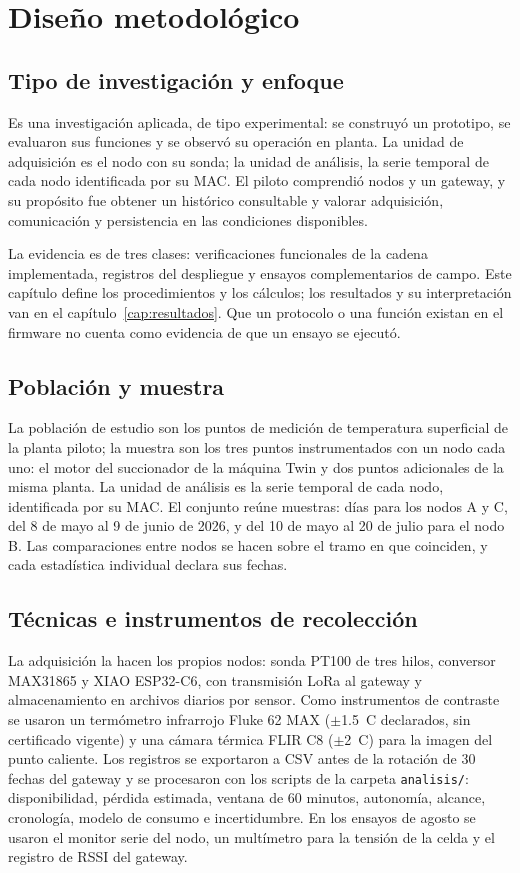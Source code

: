 \chapter{Diseño metodológico}
\label{cap:metodologia}

\section{Tipo de investigación y enfoque}
Es una investigación aplicada, de tipo experimental: se construyó un prototipo, se evaluaron sus funciones y se observó su operación en planta. La unidad de adquisición es el nodo con su sonda; la unidad de análisis, la serie temporal de cada nodo identificada por su MAC. El piloto comprendió \NumeroNodos{} nodos y un gateway, y su propósito fue obtener un histórico consultable y valorar adquisición, comunicación y persistencia en las condiciones disponibles.

La evidencia es de tres clases: verificaciones funcionales de la cadena implementada, registros del despliegue y ensayos complementarios de campo. Este capítulo define los procedimientos y los cálculos; los resultados y su interpretación van en el capítulo~\ref{cap:resultados}. Que un protocolo o una función existan en el firmware no cuenta como evidencia de que un ensayo se ejecutó.

\section{Población y muestra}
La población de estudio son los puntos de medición de temperatura superficial de la planta piloto; la muestra son los tres puntos instrumentados con un nodo cada uno: el motor del succionador de la máquina Twin y dos puntos adicionales de la misma planta. La unidad de análisis es la serie temporal de cada nodo, identificada por su MAC. El conjunto reúne \TotalMuestras{} muestras: \DuracionComunDias{} días para los nodos A y C, del 8 de mayo al 9 de junio de 2026, y del 10 de mayo al 20 de julio para el nodo B. Las comparaciones entre nodos se hacen sobre el tramo en que coinciden, y cada estadística individual declara sus fechas.

\section{Técnicas e instrumentos de recolección}
La adquisición la hacen los propios nodos: sonda PT100 de tres hilos, conversor MAX31865 y XIAO ESP32-C6, con transmisión LoRa al gateway y almacenamiento en archivos diarios por sensor. Como instrumentos de contraste se usaron un termómetro infrarrojo Fluke 62 MAX ($\pm$1.5~\textdegree C declarados, sin certificado vigente) y una cámara térmica FLIR C8 ($\pm$2~\textdegree C) para la imagen del punto caliente. Los registros se exportaron a CSV antes de la rotación de 30 fechas del gateway y se procesaron con los scripts de la carpeta \texttt{analisis/}: disponibilidad, pérdida estimada, ventana de 60 minutos, autonomía, alcance, cronología, modelo de consumo e incertidumbre. En los ensayos de agosto se usaron el monitor serie del nodo, un multímetro para la tensión de la celda y el registro de RSSI del gateway.

